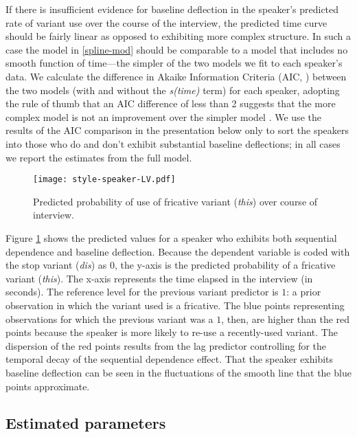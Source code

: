 \documentclass[12pt]{article}
\begin{document}
If there is insufficient evidence for baseline deflection in the speaker's predicted rate of variant use over the course of the interview, the predicted time curve should be fairly linear as opposed to exhibiting more complex structure. In such a case the model in \eqref{spline-mod} should be comparable to a model that includes no smooth function of time---the simpler of the two models we fit to each speaker's data. We calculate the difference in Akaike Information Criteria (AIC, \cite{akaike1974}) between the two models (with and without the \emph{s(time)} term) for each speaker, adopting the rule of thumb that an AIC difference of less than 2 suggests that the more complex model is not an improvement over the simpler model \citep{burnham2003}. We use the results of the AIC comparison in the presentation below only to sort the speakers into those who do and don't exhibit substantial baseline deflections; in all cases we report the estimates from the full model.


\begin{figure}
    \centering
    \texttt{[image: style-speaker-LV.pdf]}
    \caption{Predicted probability of use of fricative variant (\emph{this}) over course of interview.}
    \label{fig:style-speaker}
\end{figure}

Figure \ref{fig:style-speaker} shows the predicted values for a speaker who exhibits both sequential dependence and baseline deflection. Because the dependent variable is coded with the stop variant (\emph{dis}) as $0$, the y-axis is the predicted probability of a fricative variant (\emph{this}). The x-axis represents the time elapsed in the interview (in seconds). The reference level for the previous variant predictor is $1$: a prior observation in which the variant used is a fricative. The blue points representing observations for which the previous variant was a $1$, then, are higher than the red points because the speaker is more likely to re-use a recently-used variant. The dispersion of the red points results from the lag predictor controlling for the temporal decay of the sequential dependence effect. That the speaker exhibits baseline deflection can be seen in the fluctuations of the smooth line that the blue points approximate.


\subsection{Estimated parameters}
\end{document}
